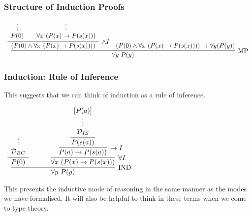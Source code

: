 \documentclass{beamer}
\theoremstyle{indentDefn} \newtheorem{defn}[]{Definition}
\begin{document}
\begin{frame}
	\frametitle{Structure of Induction Proofs}

	\begin{scriptsize}
			$\begin{array}{c}
				\infer[\MP]{\forall y \ P(y)}
					{\infer[\land I]{(P(0) \land \forall x \ (P(x) \to P(s(x))))}
						{\begin{array}{c} \vdots \\ P(0) \end{array}
						&
						\begin{array}{c} \vdots \\ \forall x \ (P(x) \to P(s(x))) \end{array}}
					&
					(P(0) \land \forall x \ (P(x) \to P(s(x)))) \rightarrow \forall y (P(y))}
			\end{array}$
	\end{scriptsize}

\end{frame}

\begin{frame}
	\frametitle{Induction: Rule of Inference}

	This suggests that we can think of induction as a rule of inference.

	\vspace{2mm}

		\begin{center}
			$\begin{array}{c}
				\infer[\IND]{\forall y \ P(y)}
						{\infer[]{P(0)}{\begin{array}{c} \vdots \\ \mathcal{D}_{BC}\end{array}} \hspace{3mm}
						&
						\hspace{3mm}
						\infer[\forall I]{\forall x \ (P(x) \to P(s(x)))}
							{\infer[\to I]{P(a) \to P(s(a))}
								{\infer[]{P(s(a))}
									{\begin{array}{c} [P(a)] \\ \vdots \\ \mathcal{D}_{IS} \end{array}}}}}
			\end{array}$
		\end{center}

	\vspace{2mm}

	This presents the inductive mode of reasoning in the same manner as the modes we have formalised. It will also be helpful to think in these terms when we come to type theory.
\end{frame}
\end{document}
